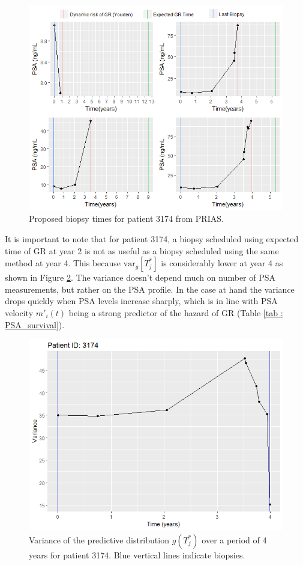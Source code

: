 \begin{figure}
\centerline{\includegraphics[width=\columnwidth]{images/prias_demo/case_3174.png}}
\caption{Proposed biopsy times for patient 3174 from PRIAS.}
\label{fig : prias_demo_pid_3174}
\end{figure}

It is important to note that for patient 3174, a biopsy scheduled using expected time of GR at year 2 is not as useful as a biopsy scheduled using the same method at year 4. This because $\mbox{var}_g[T^*_j]$ is considerably lower at year 4 as shown in Figure \ref{fig : variance_pred_dist_3174}. The variance doesn't depend much on number of PSA measurements, but rather on the PSA profile. In the case at hand the variance drops quickly when PSA levels increase sharply, which is in line with PSA velocity $m'_i(t)$ being a strong predictor of the hazard of GR (Table \ref{tab : PSA_survival}).

\begin{figure}
\centerline{\includegraphics[width=\columnwidth]{images/variance/variance_pred_dist_3174.png}}
\caption{Variance of the predictive distribution $g(T^*_j)$ over a period of 4 years for patient 3174. Blue vertical lines indicate biopsies.}
\label{fig : variance_pred_dist_3174}
\end{figure}

